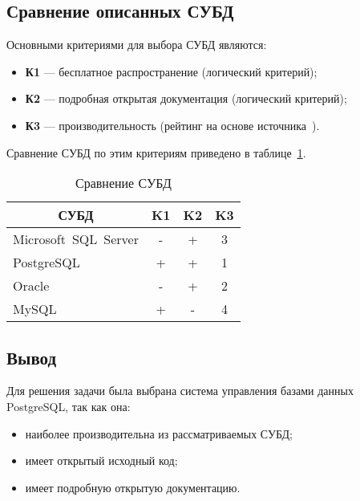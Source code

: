\subsection{Сравнение описанных СУБД}

Основными критериями для выбора СУБД являются:
\begin{itemize}
    \item \textbf{К1} --- бесплатное распространение (логический критерий);
    \item \textbf{К2} --- подробная открытая документация (логический критерий);
    \item \textbf{К3} --- производительность (рейтинг на основе
        источника~\cite{art08}).
\end{itemize}

Сравнение СУБД по этим критериям приведено в таблице~\ref{tab:02}.

\begin{table}[ht!]
\captionsetup{format=hang,justification=raggedright,
              singlelinecheck=off,width=9cm}
\centering
\caption{Сравнение СУБД\label{tab:02}}
\begin{tabular}[Hc]{|p{5cm}|c|c|c|}
    \hline
    \multicolumn{1}{|c}{\textbf{СУБД}} & \multicolumn{1}{|c|}{\textbf{K1}} &
    \multicolumn{1}{c|}{\textbf{K2}} & \multicolumn{1}{c|}{\textbf{K3}}\\
    \hline
    \mbox{Microsoft SQL Server}  & - & + & 3\\
    \hline                                                           
    \mbox{PostgreSQL}            & + & + & 1\\
    \hline                                                           
    \mbox{Oracle}                & - & + & 2\\
    \hline                                                           
    \mbox{MySQL}                 & + & - & 4\\
    \hline
\end{tabular}
\end{table}

\subsection*{Вывод}

Для решения задачи была выбрана система управления базами данных
PostgreSQL, так как она:

\begin{itemize}
    \item наиболее производительна из рассматриваемых СУБД;
    \item имеет открытый исходный код;
    \item имеет подробную открытую документацию.
\end{itemize}

